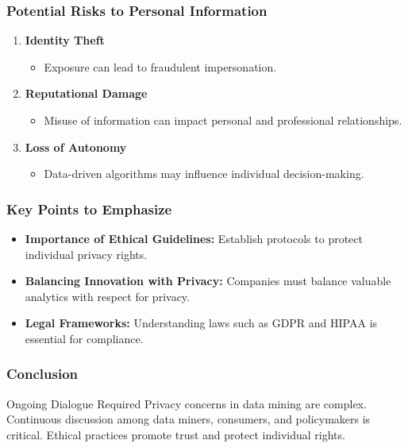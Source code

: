 \documentclass[aspectratio=169]{beamer}
\begin{document}
\begin{frame}[fragile]
    \frametitle{Potential Risks to Personal Information}
    \begin{enumerate}
        \item \textbf{Identity Theft}
            \begin{itemize}
                \item Exposure can lead to fraudulent impersonation.
            \end{itemize}
        
        \item \textbf{Reputational Damage}
            \begin{itemize}
                \item Misuse of information can impact personal and professional relationships.
            \end{itemize}
        
        \item \textbf{Loss of Autonomy}
            \begin{itemize}
                \item Data-driven algorithms may influence individual decision-making.
            \end{itemize}
    \end{enumerate}
\end{frame}

\begin{frame}[fragile]
    \frametitle{Key Points to Emphasize}
    \begin{itemize}
        \item \textbf{Importance of Ethical Guidelines:} 
            Establish protocols to protect individual privacy rights.
        
        \item \textbf{Balancing Innovation with Privacy:}
            Companies must balance valuable analytics with respect for privacy.
        
        \item \textbf{Legal Frameworks:} 
            Understanding laws such as GDPR and HIPAA is essential for compliance.
    \end{itemize}
\end{frame}

\begin{frame}[fragile]
    \frametitle{Conclusion}
    \begin{block}{Ongoing Dialogue Required}
        Privacy concerns in data mining are complex. Continuous discussion among data miners, consumers, and policymakers is critical. Ethical practices promote trust and protect individual rights.
    \end{block}
\end{frame}
\end{document}
